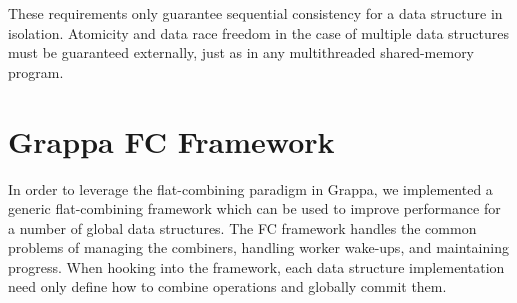 


These requirements only guarantee sequential consistency for a data structure in isolation. Atomicity and data race freedom in the case of multiple data structures must be guaranteed externally, just as in any multithreaded shared-memory program.

\section{Grappa FC Framework}
In order to leverage the flat-combining paradigm in Grappa, we implemented a generic flat-combining framework which can be used to improve performance for a number of global data structures. The FC framework handles the common problems of managing the combiners, handling worker wake-ups, and maintaining progress. When hooking into the framework, each data structure implementation need only define how to combine operations and globally commit them.

